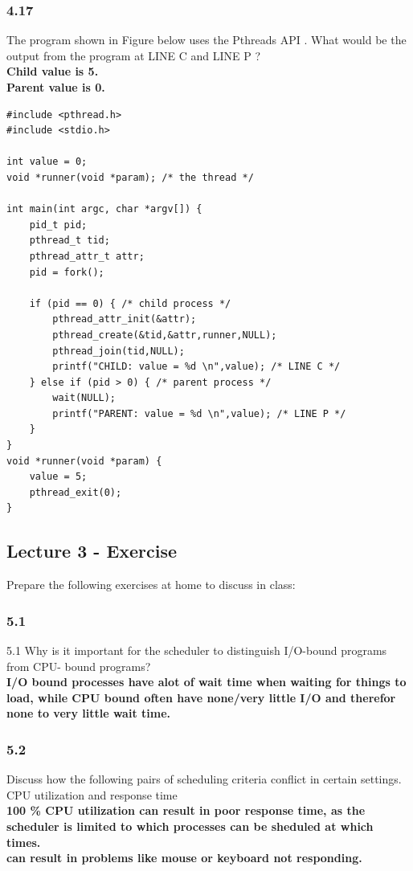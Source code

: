 \documentclass[a4paper,10pt,titlepage]{report}
\begin{document}
\subsubsection{4.17}
The program shown in Figure below uses the Pthreads API . What would be the output from the program at LINE C and LINE P ?\\
\textbf{
Child value is 5.\\
Parent value is 0.
}
\begin{lstlisting}[frame=single]
#include <pthread.h>
#include <stdio.h>
 
int value = 0;
void *runner(void *param); /* the thread */
 
int main(int argc, char *argv[]) {
    pid_t pid;
    pthread_t tid;
    pthread_attr_t attr;
    pid = fork();
 
    if (pid == 0) { /* child process */
        pthread_attr_init(&attr);
        pthread_create(&tid,&attr,runner,NULL);
        pthread_join(tid,NULL);
        printf("CHILD: value = %d \n",value); /* LINE C */
    } else if (pid > 0) { /* parent process */
        wait(NULL);
        printf("PARENT: value = %d \n",value); /* LINE P */
    }
}
void *runner(void *param) {
    value = 5;
    pthread_exit(0);
}   
\end{lstlisting}
\newpage
\subsection{Lecture 3 - Exercise}

Prepare the following exercises at home to discuss in class:
\\
\subsubsection{5.1}
5.1 Why is it important for the scheduler to distinguish I/O-bound programs from CPU- bound programs?\\
\hspace{20mm} \textbf{
I/O bound processes have alot of wait time when waiting for things to load, while CPU bound often have none/very little I/O and therefor none to very little wait time.
} \\


\subsubsection{5.2}
Discuss how the following pairs of scheduling criteria conflict in certain settings.\\
\hspace{10mm} CPU utilization and response time\\
\hspace{20mm}  \textbf{
100 \% CPU utilization can result in poor response time, as the scheduler is limited to which processes can be sheduled at which times.\\ can result in problems like mouse or keyboard not responding.
} \\
\end{document}
